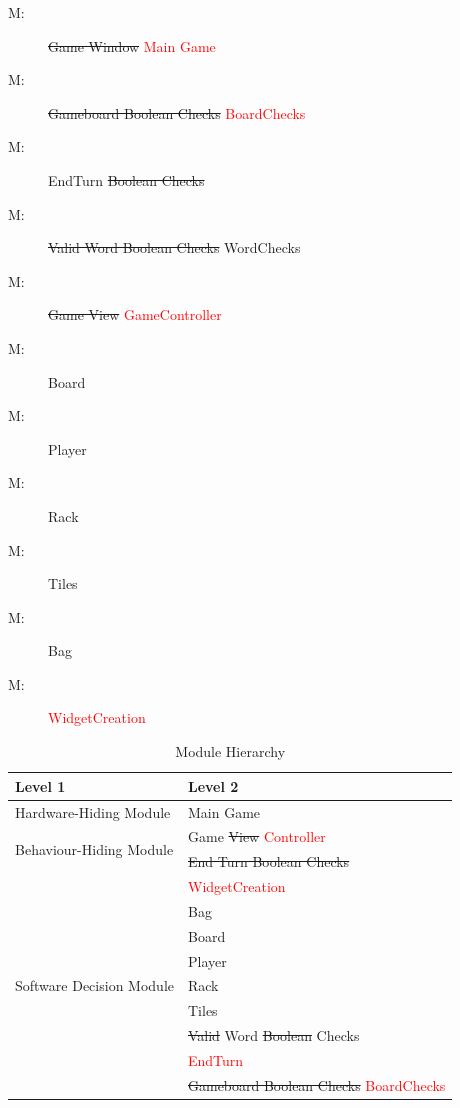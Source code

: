 \documentclass[12pt, titlepage]{article}
\newcounter{mnum}
\newcommand{\mthemnum}{M\themnum}
\begin{document}
\begin{description}
\item [ \mthemnum \label{mHHGW}:] \sout{Game Window} \textcolor{red}{Main Game} %
\item [ \mthemnum \label{mBHGB}:] \sout{Gameboard Boolean Checks} \textcolor{red}{BoardChecks} %
\item [ \mthemnum \label{mBHET}:] EndTurn \sout{Boolean Checks} %
\item [ \mthemnum \label{mBHVW}:] \sout{Valid Word Boolean Checks} WordChecks %
\item [ \mthemnum \label{mBHGV}:] \sout{Game View} \textcolor{red}{GameController} %
\item [ \mthemnum \label{mSDBO}:] Board %
\item [ \mthemnum \label{mSDP}:] Player %
\item [ \mthemnum \label{mSDR}:] Rack %
\item [ \mthemnum \label{mSDT}:] Tiles %
\item [ \mthemnum \label{mSDB}:] Bag %
 \item [ \mthemnum \label{mSDB}:] \textcolor{red}{WidgetCreation} %
\end{description}


\begin{table}[h!]
\centering
\begin{tabular}{p{} p{}}
\toprule
\textbf{Level 1} & \textbf{Level 2}\\
\midrule

{Hardware-Hiding Module} & Main Game \\
\midrule

\multirow{2}{0.3\textwidth}{Behaviour-Hiding Module} & Game \sout{View} \textcolor{red}{Controller}\\
& \sout{End Turn Boolean Checks}\\
& \textcolor{red}{WidgetCreation}\\


\midrule

\multirow{7}{0.3\textwidth}{Software Decision Module} & Bag\\
& Board\\
& Player\\
& Rack\\
& Tiles\\
& \sout{Valid} Word \sout{Boolean} Checks\\
& \textcolor{red}{EndTurn}\\
& \sout{Gameboard Boolean Checks} \textcolor{red}{BoardChecks}\\
\bottomrule

\end{tabular}
\caption{Module Hierarchy}
\label{TblMH}
\end{table}
\end{document}
